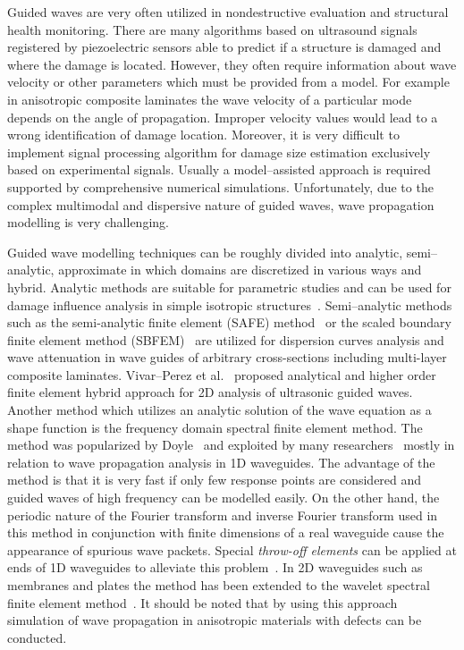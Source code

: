 \documentclass[preprint,12pt]{elsarticle}
\begin{document}
	Guided waves are very often utilized in nondestructive evaluation and structural health monitoring. There are many algorithms based on ultrasound signals registered by piezoelectric sensors able to predict if a structure is damaged and where the damage is located. However, they often require information about wave velocity or other parameters which must be provided from a model. For example in anisotropic composite laminates the wave velocity of a particular mode depends on the angle of propagation. Improper velocity values would lead to a wrong identification of damage location.  Moreover, it is very difficult to implement signal processing algorithm for damage size estimation exclusively based on experimental signals. Usually a model--assisted approach is required supported by comprehensive numerical simulations. Unfortunately, due to the complex multimodal and dispersive nature of guided waves, wave propagation modelling is very challenging. 
	
	Guided wave modelling techniques can be roughly divided into analytic, semi--analytic, approximate in which domains are discretized in various ways and hybrid. Analytic methods are suitable for parametric studies and can be used for damage influence analysis in simple isotropic structures~\cite{Giurgiutiu2014}. Semi--analytic methods such as the semi-analytic finite element (SAFE) method~\cite{Bartoli2006} or the scaled boundary finite element method (SBFEM)~\cite{Gravenkamp2014} are utilized for dispersion curves analysis and wave attenuation in wave guides of arbitrary cross-sections including multi-layer composite laminates. Vivar--Perez et al.~\cite{Vivar-Perez2014} proposed analytical and higher order finite element hybrid approach for 2D analysis of ultrasonic guided waves. Another method which utilizes an analytic solution of the wave equation as a shape function is the frequency domain spectral finite element method. The method was popularized by Doyle~\cite{Doyle1989} and exploited by many researchers~\cite{RoyMahapatra2003,Palacz2005} mostly in relation to wave propagation analysis in 1D waveguides. The advantage of the method is that it is very fast if only few response points are considered and guided waves of high frequency can be modelled easily. On the other hand, the periodic nature of the Fourier transform and inverse Fourier transform used in this method in conjunction with finite dimensions of a real waveguide cause the appearance of spurious wave packets. Special \emph{throw-off elements} can be applied at ends of 1D waveguides to alleviate this problem~\cite{Doyle1989}. In 2D waveguides such as membranes and plates the method has been extended to the wavelet spectral finite element method~\cite{Mitra2008,Yang2016}. It should be noted that by using this approach simulation of wave propagation in anisotropic materials with defects can be conducted.
	
\end{document}
